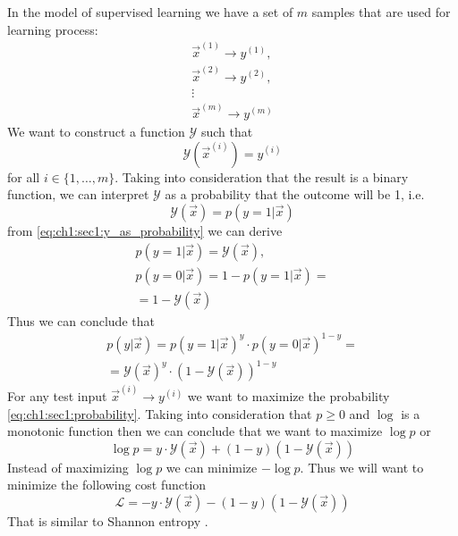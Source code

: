 In the model of supervised learning we have a set of $m$ samples that are used
for learning process:
\[
\begin{array}{c}
  \vec{x}^{(1)} \rightarrow y^{(1)}, \\
  \vec{x}^{(2)} \rightarrow y^{(2)}, \\
  \vdots \\
  \vec{x}^{(m)} \rightarrow y^{(m)}
\end{array}
\]
We want to construct a function $\mathcal{Y}$ such that
\[
\mathcal{Y}\left(\vec{x}^{(i)}\right) = y^{(i)}
\]
for all $i \in \{1, \dots, m\}$. Taking into consideration that the result is a
binary function, we can interpret $\mathcal{Y}$ as a probability that the
outcome will be 1, i.e.
\begin{equation}
  \mathcal{Y}\left(\vec{x}\right) = p\left(\left. y = 1\right|\vec{x}\right)
  \label{eq:ch1:sec1:y_as_probability}
\end{equation}
from \cref{eq:ch1:sec1:y_as_probability} we can derive
\begin{eqnarray}
  p\left(\left. y = 1\right|\vec{x}\right) = \mathcal{Y}\left(\vec{x}\right),
  \nonumber \\
  p\left(\left. y = 0\right|\vec{x}\right) = 1 - p\left(\left. y =
  1\right|\vec{x}\right) =
  \nonumber \\
  = 1 - \mathcal{Y}\left(\vec{x}\right)
  \nonumber
\end{eqnarray}
Thus we can conclude that
\begin{eqnarray}
  p\left(\left. y\right|\vec{x}\right) =
  p\left(\left. y = 1\right|\vec{x}\right)^y \cdot
  p\left(\left. y = 0\right|\vec{x}\right)^{1-y} =
  \nonumber \\
  = \mathcal{Y}\left(\vec{x}\right)^y \cdot
  \left(1 - \mathcal{Y}\left(\vec{x}\right)\right)^{1 - y}
\label{eq:ch1:sec1:probability}
\end{eqnarray}
For any test input $\vec{x}^{(i)} \rightarrow y^{(i)}$ we want to maximize the
probability \cref{eq:ch1:sec1:probability}. Taking into consideration that
$p \ge 0$ and $\log$ is a monotonic function then we can conclude that we want
to maximize $\log p$ or
\begin{equation}
\log p = y \cdot \mathcal{Y}\left(\vec{x}\right) +
(1-y) \left(1 - \mathcal{Y}\left(\vec{x}\right)\right)
\label{eq:ch1:sec1:logp}
\end{equation}
Instead of maximizing $\log p$ we can minimize $- \log p$. Thus we will want to
minimize the following cost function
\begin{equation}
  \mathcal{L} = - y \cdot \mathcal{Y}\left(\vec{x}\right) -
(1-y) \left(1 - \mathcal{Y}\left(\vec{x}\right)\right)
  \label{eq:ch1:sec1:cost_func}
\end{equation}
That is similar to Shannon entropy \cite{wiki:entropy_information}.

